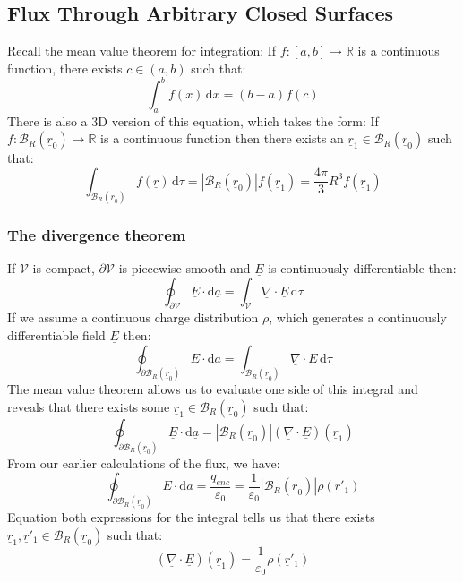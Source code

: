 \documentclass[12pt]{article}
\newcommand{\dive}[1]{\underline{\nabla}\cdot\underline{#1}}
\begin{document}
\subsection{Flux Through Arbitrary Closed Surfaces}
Recall the mean value theorem for integration: If \(f:[a,b]\to\mathbb{R}\) is a continuous function, there exists \(c\in(a,b)\) such that:
\[\int^b_af(x)\,\text{d}x=(b-a)f(c)\]
There is also a 3D version of this equation, which takes the form: If \(f:\mathcal{B}_R(\underline{r}_0)\to \mathbb{R}\) is a continuous function then there exists an \(\underline{r}_1\in\mathcal{B}_R(\underline{r}_0)\) such that:
\[\int_{\mathcal{B}_R(\underline{r}_0)}f(\underline{r})\,\text{d}\tau=|\mathcal{B}_R(\underline{r}_0)|f(\underline{r}_1)=\frac{4\pi}{3}R^3f(\underline{r}_1)\]
\subsubsection{The divergence theorem}
If \(\mathcal{V}\) is compact, \(\partial \mathcal{V}\) is piecewise smooth and \(\underline{E}\) is continuously differentiable then:
\[\oint_{\partial\mathcal{V}}\underline{E}\cdot \text{d}\underline{a}=\int_{\mathcal{V}}\dive{E}\,\text{d}\tau\]
If we assume a continuous charge distribution \(\rho\), which generates a continuously differentiable field \(\underline{E}\) then:
\[\oint_{\partial\mathcal{B}_R(\underline{r}_0)}\underline{E}\cdot\text{d}\underline{a}=\int_{\mathcal{B}_R(\underline{r}_0)}\dive{E}\,\text{d}\tau\]
The mean value theorem allows us to evaluate one side of this integral and reveals that there exists some \(\underline{r}_1\in\mathcal{B}_R(\underline{r}_0)\) such that:
\[\oint_{\partial\mathcal{B}_R(\underline{r}_0)}\underline{E}\cdot \text{d}\underline{a}=|\mathcal{B}_R(\underline{r}_0)|(\dive{E})(\underline{r}_1)\]
From our earlier calculations of the flux, we have:
\[\oint_{\partial \mathcal{B}_R(\underline{r}_0)}\underline{E}\cdot \text{d}\underline{a}=\frac{q_{enc}}{\varepsilon_0}=\frac{1}{\varepsilon_0}|\mathcal{B}_R(\underline{r}_0)|\rho(\underline{r}'_1)\]
Equation both expressions for the integral tells us that there exists \(\underline{r}_1,\underline{r}'_1\in\mathcal{B}_R(\underline{r}_0)\) such that:
\[(\dive{E})(\underline{r}_1)=\frac{1}{\varepsilon_0}\rho(\underline{r}'_1)\]
\end{document}
